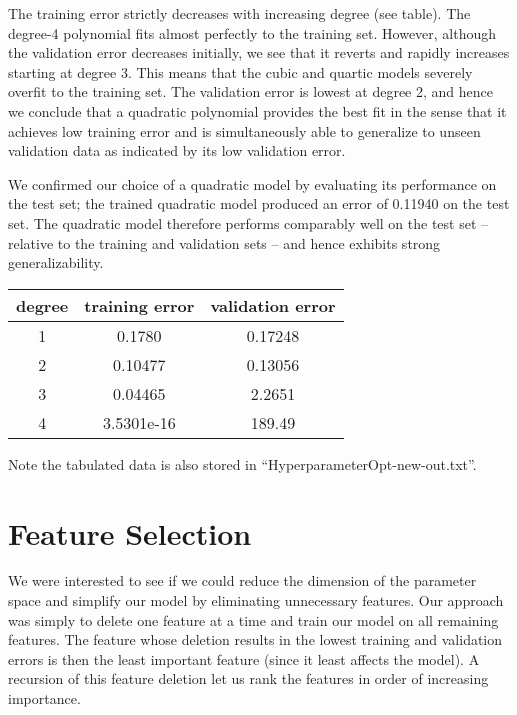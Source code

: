 \documentclass[12pt]{article}
\begin{document}
The training error strictly decreases with increasing degree (see table). The degree-4 polynomial fits almost perfectly to the training set. However, although the validation error decreases initially, we see that it reverts and rapidly increases starting at degree 3. This means that the cubic and quartic models severely overfit to the training set. The validation error is lowest at degree 2, and hence we conclude that a quadratic polynomial provides the best fit in the sense that it achieves low training error and is simultaneously able to generalize to unseen validation data as indicated by its low validation error.

We confirmed our choice of a quadratic model by evaluating its performance on the test set; the trained quadratic model produced an error of 0.11940 on the test set. The quadratic model therefore performs comparably well on the test set -- relative to the training and validation sets -- and hence exhibits strong generalizability.

\begin{center}
\begin{tabular}{|c|c|c|} \hline
degree & training error & validation error \\ \hline
1 & 0.1780 & 0.17248 \\
2 & 0.10477 & 0.13056 \\
3 & 0.04465 & 2.2651 \\
4 & 3.5301e-16 & 189.49 \\
\hline
\end{tabular}
\end{center}

Note the tabulated data is also stored in ``HyperparameterOpt-new-out.txt''.

\section{Feature Selection}

We were interested to see if we could reduce the dimension of the parameter space and simplify our model by eliminating unnecessary features. Our approach was simply to delete one feature at a time and train our model on all remaining features. The feature whose deletion results in the lowest training and validation errors is then the least important feature (since it least affects the model). A recursion of this feature deletion let us rank the features in order of increasing importance.
\end{document}
